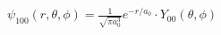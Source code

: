 \documentclass[preview]{standalone}
\begin{document}
\begin{center}
$\psi_{100}(r, \theta, \phi) = \frac{1}{\sqrt{\pi a_0^3}} e^{-r/a_0} \cdot Y_{00}(\theta, \phi)$
\end{center}
\end{document}
